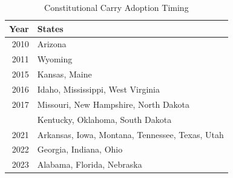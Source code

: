 \begin{table}[!h]
\centering
\caption{\label{tab:timing}Constitutional Carry Adoption Timing}
\centering
\begin{tabular}[t]{rl}
\toprule
Year & States\\
\midrule
2010 & Arizona\\
2011 & Wyoming\\
2015 & Kansas, Maine\\
2016 & Idaho, Mississippi, West Virginia\\
2017 & Missouri, New Hampshire, North Dakota\\
\addlinespace
2019 & Kentucky, Oklahoma, South Dakota\\
2021 & Arkansas, Iowa, Montana, Tennessee, Texas, Utah\\
2022 & Georgia, Indiana, Ohio\\
2023 & Alabama, Florida, Nebraska\\
\bottomrule
\end{tabular}
\end{table}
